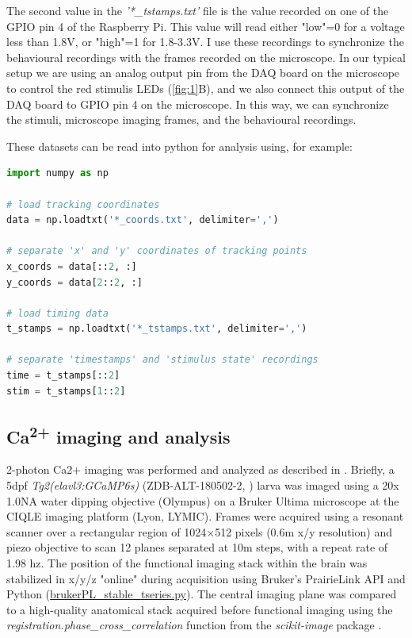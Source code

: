 \documentclass[9pt,lineno]{RandlettLab_elife}
\begin{document}
The second value in the \emph{'*\_tstamps.txt'} file is the value recorded on one of the GPIO pin 4 of the Raspberry Pi. This value will read either "low"=0 for a voltage less than 1.8V, or "high"=1 for 1.8-3.3V. I use these recordings to synchronize the behavioural recordings with the frames recorded on the microscope. In our typical setup we are using an analog output pin from the DAQ board on the microscope to control the red stimulis LEDs (\autoref{fig:1}B), and we also connect this output of the DAQ board to GPIO pin 4 on the microscope. In this way, we can synchronize the stimuli, microscope imaging frames, and the behavioural recordings. 

These datasets can be read into python for analysis using, for example: 

\begin{adjustwidth}{2cm}{}
\begin{lstlisting}[language=Python, basicstyle=\small]
import numpy as np

# load tracking coordinates
data = np.loadtxt('*_coords.txt', delimiter=',') 

# separate 'x' and 'y' coordinates of tracking points
x_coords = data[::2, :] 
y_coords = data[2::2, :]

# load timing data
t_stamps = np.loadtxt('*_tstamps.txt', delimiter=',')

# separate 'timestamps' and 'stimulus state' recordings
time = t_stamps[::2]
stim = t_stamps[1::2]

\end{lstlisting}
\end{adjustwidth}


\subsection{Ca\textsuperscript{2+} imaging and analysis}

2-photon Ca2+ imaging was performed and analyzed as described in \citep{Lamire2023-di}. Briefly, a 5dpf \emph{Tg2(elavl3:GCaMP6s)} (ZDB-ALT-180502-2, \cite{Dunn2016-bg}) larva was imaged using a 20x 1.0NA water dipping objective (Olympus) on a Bruker Ultima microscope at the CIQLE imaging platform (Lyon, LYMIC). Frames were acquired using a resonant scanner over a rectangular region of 1024×512 pixels (0.6\micro m x/y resolution) and piezo objective to scan 12 planes separated at 10\micro m steps, with a repeat rate of 1.98 hz. The position of the functional imaging stack within the brain was stabilized in x/y/z "online" during acquisition using Bruker's PrairieLink API and Python (\href{https://github.com/owenrandlett/pi_tailtrack/blob/main/brukerPL_stable_tseries.py}{brukerPL\_stable\_tseries.py}). The central imaging plane was compared to a high-quality anatomical stack acquired before functional imaging using the \emph{ registration.phase\_cross\_correlation} function from the \emph{scikit-image} package \citep{van2014scikit}. 
\end{document}
